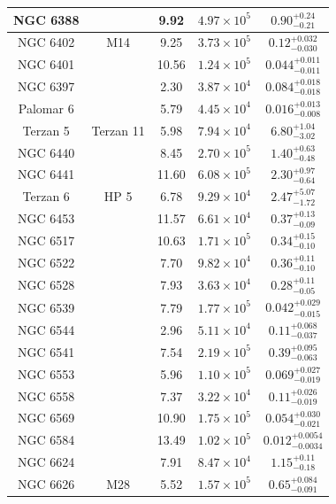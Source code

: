 \begin{longtable}{|c|c|c|c|c|}
\hline
NGC 6388 & & 9.92 & $4.97\times 10^{5}$ & $0.90_{-0.21}^{+0.24 }$ \\
\hline
NGC 6402 & M14 & 9.25 & $3.73\times 10^{5}$ & $0.12_{-0.030}^{+0.032 }$ \\
\hline
NGC 6401 & & 10.56 & $1.24\times 10^{5}$ & $0.044_{-0.011}^{+0.011 }$ \\
\hline
NGC 6397 & & 2.30 & $3.87\times 10^{4}$ & $0.084_{-0.018}^{+0.018 }$ \\
\hline
Palomar 6 & & 5.79 & $4.45\times 10^{4}$ & $0.016_{-0.008}^{+0.013 }$ \\
\hline
Terzan 5 & Terzan 11 & 5.98 & $7.94\times 10^{4}$ & $6.80_{-3.02}^{+1.04 }$ \\
\hline
NGC 6440 & & 8.45 & $2.70\times 10^{5}$ & $1.40_{-0.48}^{+0.63 }$ \\
\hline
NGC 6441 & & 11.60 & $6.08\times 10^{5}$ & $2.30_{-0.64}^{+0.97 }$ \\
\hline
Terzan 6 & HP 5 & 6.78 & $9.29\times 10^{4}$ & $2.47_{-1.72}^{+5.07 }$ \\
\hline
NGC 6453 & & 11.57 & $6.61\times 10^{4}$ & $0.37_{-0.09}^{+0.13 }$ \\
\hline
NGC 6517 & & 10.63 & $1.71\times 10^{5}$ & $0.34_{-0.10}^{+0.15 }$ \\
\hline
NGC 6522 & & 7.70 & $9.82\times 10^{4}$ & $0.36_{-0.10}^{+0.11 }$ \\
\hline
NGC 6528 & & 7.93 & $3.63\times 10^{4}$ & $0.28_{-0.05}^{+0.11 }$ \\
\hline
NGC 6539 & & 7.79 & $1.77\times 10^{5}$ & $0.042_{-0.015}^{+0.029 }$ \\
\hline
NGC 6544 & & 2.96 & $5.11\times 10^{4}$ & $0.11_{-0.037}^{+0.068 }$ \\
\hline
NGC 6541 & & 7.54 & $2.19\times 10^{5}$ & $0.39_{-0.063}^{+0.095 }$ \\
\hline
NGC 6553 & & 5.96 & $1.10\times 10^{5}$ & $0.069_{-0.019}^{+0.027 }$ \\
\hline
NGC 6558 & & 7.37 & $3.22\times 10^{4}$ & $0.11_{-0.019}^{+0.026 }$ \\
\hline
NGC 6569 & & 10.90 & $1.75\times 10^{5}$ & $0.054_{-0.021}^{+0.030 }$ \\
\hline
NGC 6584 & & 13.49 & $1.02\times 10^{5}$ & $0.012_{-0.0034}^{+0.0054 }$  \\
\hline
NGC 6624 & & 7.91 & $8.47\times 10^{4}$ & $1.15_{-0.18}^{+0.11 }$ \\
\hline
NGC 6626 & M28 & 5.52 & $1.57\times 10^{5}$ & $0.65_{-0.091}^{+0.084 }$ \\

\end{longtable}
